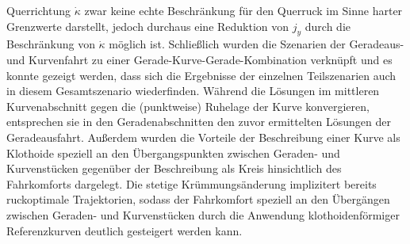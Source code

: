 Querrichtung $\dot{\kappa}$ zwar keine echte Beschränkung für den Querruck im Sinne harter Grenzwerte darstellt, jedoch durchaus eine Reduktion von $j_y$ durch die Beschränkung von $\dot{\kappa}$ möglich ist. Schließlich wurden die Szenarien der Geradeaus- und Kurvenfahrt zu einer Gerade-Kurve-Gerade-Kombination verknüpft und es konnte gezeigt werden, dass sich die Ergebnisse der einzelnen Teilszenarien auch in diesem Gesamtszenario wiederfinden. Während die Lösungen im mittleren Kurvenabschnitt gegen die (punktweise) Ruhelage der Kurve konvergieren, entsprechen sie in den Geradenabschnitten den zuvor ermittelten Lösungen der Geradeausfahrt. Außerdem wurden die Vorteile der Beschreibung einer Kurve als Klothoide speziell an den Übergangspunkten zwischen Geraden- und Kurvenstücken gegenüber der Beschreibung als Kreis hinsichtlich des Fahrkomforts dargelegt. Die stetige Krümmungsänderung implizitert bereits ruckoptimale Trajektorien, sodass der Fahrkomfort speziell an den Übergängen zwischen Geraden- und Kurvenstücken durch die Anwendung klothoidenförmiger Referenzkurven deutlich gesteigert werden kann. 


